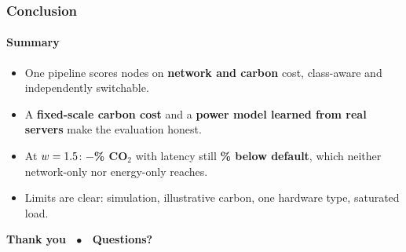 \documentclass[aspectratio=169,11pt]{beamer}
\begin{document}
\begin{frame}[t]
\frametitle{Conclusion}
\framesubtitle{Summary}
\begin{itemize}
\item One pipeline scores nodes on \textbf{network and carbon} cost, class-aware and independently switchable.
\item A \textbf{fixed-scale carbon cost} and a \textbf{power model learned from \NSystemsKept{} real servers} make the evaluation honest.
\item At $w=1.5$: \textbf{$-$\FusedCO\% CO$_2$} with latency still \textbf{\FusedLatCut\% below default}, which neither network-only nor energy-only reaches.
\item Limits are clear: simulation, illustrative carbon, one hardware type, saturated load.
\end{itemize}
\vspace{10pt}
\begin{center}{\Large\bfseries\color{navy} Thank you \ $\bullet$ \ Questions?}\end{center}
\end{frame}
\end{document}
